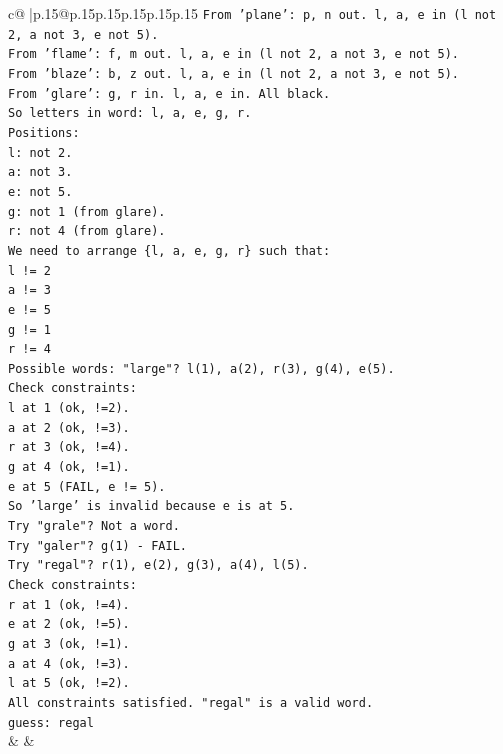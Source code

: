 \documentclass{article}
\begin{document}
{\begin{supertabular}{c@{$\;$}|p{.15\linewidth}@{}p{.15\linewidth}p{.15\linewidth}p{.15\linewidth}p{.15\linewidth}p{.15\linewidth}}
{{{\texttt{From 'plane': p, n out. l, a, e in (l not 2, a not 3, e not 5).} \\
\texttt{From 'flame': f, m out. l, a, e in (l not 2, a not 3, e not 5).} \\
\texttt{From 'blaze': b, z out. l, a, e in (l not 2, a not 3, e not 5).} \\
\texttt{From 'glare': g, r in. l, a, e in. All black.} \\
\texttt{So letters in word: l, a, e, g, r.} \\
\texttt{Positions:} \\
\texttt{l: not 2.} \\
\texttt{a: not 3.} \\
\texttt{e: not 5.} \\
\texttt{g: not 1 (from glare).} \\
\texttt{r: not 4 (from glare).} \\
\texttt{We need to arrange \{l, a, e, g, r\} such that:} \\
\texttt{l != 2} \\
\texttt{a != 3} \\
\texttt{e != 5} \\
\texttt{g != 1} \\
\texttt{r != 4} \\
\texttt{Possible words: "large"? l(1), a(2), r(3), g(4), e(5).} \\
\texttt{Check constraints:} \\
\texttt{l at 1 (ok, !=2).} \\
\texttt{a at 2 (ok, !=3).} \\
\texttt{r at 3 (ok, !=4).} \\
\texttt{g at 4 (ok, !=1).} \\
\texttt{e at 5 (FAIL, e != 5).} \\
\texttt{So 'large' is invalid because e is at 5.} \\
\texttt{Try "grale"? Not a word.} \\
\texttt{Try "galer"? g(1) {-} FAIL.} \\
\texttt{Try "regal"? r(1), e(2), g(3), a(4), l(5).} \\
\texttt{Check constraints:} \\
\texttt{r at 1 (ok, !=4).} \\
\texttt{e at 2 (ok, !=5).} \\
\texttt{g at 3 (ok, !=1).} \\
\texttt{a at 4 (ok, !=3).} \\
\texttt{l at 5 (ok, !=2).} \\
\texttt{All constraints satisfied. "regal" is a valid word.} \\
\texttt{guess: regal} \\
            }
        }
    }
    & & \\ \\


\end{supertabular}}
\end{document}
